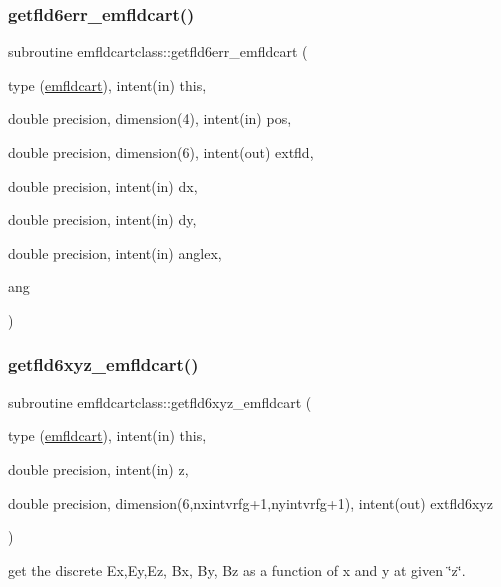 \subsubsection{\texorpdfstring{getfld6err\_emfldcart()}{getfld6err\_emfldcart()}}
{\footnotesize\ttfamily subroutine emfldcartclass\+::getfld6err\+\_\+emfldcart (\begin{DoxyParamCaption}\item[{type (\mbox{\hyperlink{namespaceemfldcartclass_structemfldcartclass_1_1emfldcart}{emfldcart}}), intent(in)}]{this,  }\item[{double precision, dimension(4), intent(in)}]{pos,  }\item[{double precision, dimension(6), intent(out)}]{extfld,  }\item[{double precision, intent(in)}]{dx,  }\item[{double precision, intent(in)}]{dy,  }\item[{double precision, intent(in)}]{anglex,  }\item[{}]{ang }\end{DoxyParamCaption})}

\mbox{\label{namespaceemfldcartclass_a524c612ff816f308845b0171733a95a5}} 
\subsubsection{\texorpdfstring{getfld6xyz\_emfldcart()}{getfld6xyz\_emfldcart()}}
{\footnotesize\ttfamily subroutine emfldcartclass\+::getfld6xyz\+\_\+emfldcart (\begin{DoxyParamCaption}\item[{type (\mbox{\hyperlink{namespaceemfldcartclass_structemfldcartclass_1_1emfldcart}{emfldcart}}), intent(in)}]{this,  }\item[{double precision, intent(in)}]{z,  }\item[{double precision, dimension(6,nxintvrfg+1,nyintvrfg+1), intent(out)}]{extfld6xyz }\end{DoxyParamCaption})}



get the discrete Ex,Ey,Ez, Bx, By, Bz as a function of x and y at given \char`\"{}z\char`\"{}. 

\mbox{\label{namespaceemfldcartclass_af92b0973e83fa817606951d4155f51b9}} 
